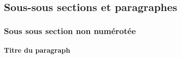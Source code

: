 \subsection{Sous-sous sections et paragraphes}%
\label{ssec:sectionandparagraphs}

\subsubsection*{Sous sous section non numérotée}

\blindtext[8]

\paragraph{Titre du paragraph} \blindtext[9]

